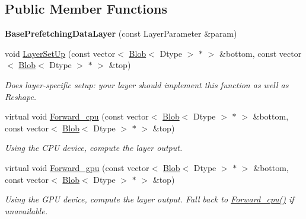 \subsection*{Public Member Functions}
\begin{DoxyCompactItemize}
\item 
{\bfseries Base\+Prefetching\+Data\+Layer} (const Layer\+Parameter \&param)\hypertarget{classcaffe_1_1BasePrefetchingDataLayer_a527e2b51c73759ea5f7e28ced6a371ef}{}\label{classcaffe_1_1BasePrefetchingDataLayer_a527e2b51c73759ea5f7e28ced6a371ef}

\item 
void \hyperlink{classcaffe_1_1BasePrefetchingDataLayer_af433228727bf4f3f3aaa85434efc93c5}{Layer\+Set\+Up} (const vector$<$ \hyperlink{classcaffe_1_1Blob}{Blob}$<$ Dtype $>$ $\ast$ $>$ \&bottom, const vector$<$ \hyperlink{classcaffe_1_1Blob}{Blob}$<$ Dtype $>$ $\ast$ $>$ \&top)
\begin{DoxyCompactList}\small\item\em Does layer-\/specific setup\+: your layer should implement this function as well as Reshape. \end{DoxyCompactList}\item 
virtual void \hyperlink{classcaffe_1_1BasePrefetchingDataLayer_a478965447079f7408d88c58f4a0dc49c}{Forward\+\_\+cpu} (const vector$<$ \hyperlink{classcaffe_1_1Blob}{Blob}$<$ Dtype $>$ $\ast$ $>$ \&bottom, const vector$<$ \hyperlink{classcaffe_1_1Blob}{Blob}$<$ Dtype $>$ $\ast$ $>$ \&top)\hypertarget{classcaffe_1_1BasePrefetchingDataLayer_a478965447079f7408d88c58f4a0dc49c}{}\label{classcaffe_1_1BasePrefetchingDataLayer_a478965447079f7408d88c58f4a0dc49c}

\begin{DoxyCompactList}\small\item\em Using the C\+PU device, compute the layer output. \end{DoxyCompactList}\item 
virtual void \hyperlink{classcaffe_1_1BasePrefetchingDataLayer_a950e9d525c7c07ef43567067805e7b70}{Forward\+\_\+gpu} (const vector$<$ \hyperlink{classcaffe_1_1Blob}{Blob}$<$ Dtype $>$ $\ast$ $>$ \&bottom, const vector$<$ \hyperlink{classcaffe_1_1Blob}{Blob}$<$ Dtype $>$ $\ast$ $>$ \&top)\hypertarget{classcaffe_1_1BasePrefetchingDataLayer_a950e9d525c7c07ef43567067805e7b70}{}\label{classcaffe_1_1BasePrefetchingDataLayer_a950e9d525c7c07ef43567067805e7b70}

\begin{DoxyCompactList}\small\item\em Using the G\+PU device, compute the layer output. Fall back to \hyperlink{classcaffe_1_1BasePrefetchingDataLayer_a478965447079f7408d88c58f4a0dc49c}{Forward\+\_\+cpu()} if unavailable. \end{DoxyCompactList}\end{DoxyCompactItemize}
